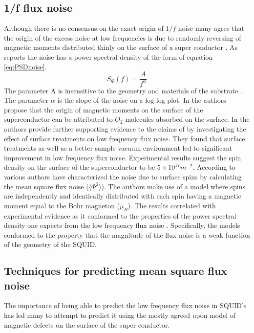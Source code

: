 \subsection{1/f flux noise}
Although there is no consensus on the exact origin of $1/f$ noise many agree that the origin of the excess noise at low frequencies is due to randomly reversing of magnetic moments distributed thinly on the surface of a super conductor \cite{FluxNoiseCol}. As \cite{FluxNoiseCol} reports the noise has a power spectral density of the form of equation \ref{eq:PSDnoise}.
\begin{equation}
    S_\Phi(f) = \frac{A}{f^\alpha}
    \label{eq:PSDnoise}
\end{equation}
The parameter A is insensitive to the geometry and materials of the substrate \cite{fluxNoiseSquidsStevenAnton}. The parameter $\alpha$ is the slope of the noise on a log-log plot. In \cite{SurfaceSpinOrig} the authors propose that the origin of magnetic moments on the surface of the superconductor can be attributed to $O_2$ molecules absorbed on the surface. In \cite{OriginAndReductionOf1/fNoise} the authors provide further supporting evidence to the claims of \cite{SurfaceSpinOrig} by investigating the effect of surface treatments on low frequency flux noise. They found that surface treatments as well as a better sample vacuum environment led to significant improvement in low frequency flux noise. Experimental results suggest the spin density on the surface of the superconductor to be $5\times10^{17}m^{-2}$. According to \cite{fluxNoiseSquidsStevenAnton} various authors have characterized the noise due to surface spins by calculating the mean square flux noise ($\langle \Phi^2\rangle $). The authors make use of a model where spins are independently and identically distributed with each spin having a magnetic moment equal to the Bohr magneton ($\mu_B$). The results correlated with experimental evidence as it conformed to the properties of the power spectral density one expects from the low frequency flux noise \cite{fluxNoiseSquidsStevenAnton}. Specifically, the models conformed to the property that the magnitude of the flux noise is a weak function of the geometry of the SQUID.

\subsection{Techniques for predicting mean square flux noise}
\label{subsec:PredictFluxNoise}
The importance of being able to predict the low frequency flux noise in SQUID's has led many to attempt to predict it using the mostly agreed upon model of magnetic defects on the surface of the super conductor.

